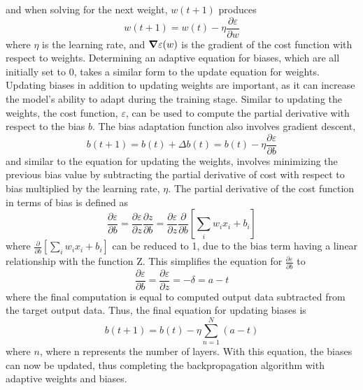 \documentclass[twocolumn]{article}
\begin{document}
and when solving for the next weight, $w(t+1)$ produces
\begin{equation}
    w(t+1) = w(t) - \eta \frac{\partial \varepsilon}{\partial w}
\end{equation}
where $\eta$ is the learning rate, and $\grad \varepsilon(w)$ is the gradient of the cost function with respect to weights. \cite{reid} Determining an adaptive equation for biases, which are all initially set to 0, takes a similar form to the update equation for weights. Updating biases in addition to updating weights are important, as it can increase the model's ability to adapt during the training stage. Similar to updating the weights, the cost function, $\varepsilon$, can be used to compute the partial derivative with respect to the bias $b$.\cite{zhang} The bias adaptation function also involves gradient descent, 
\begin{equation}
    b(t+1) = b(t) + \Delta b(t) = b(t) - \eta \frac{\partial \varepsilon}{\partial b}
\end{equation}
and similar to the equation for updating the weights, involves minimizing the previous bias value by subtracting the partial derivative of cost with respect to bias multiplied by the learning rate, $\eta$.\cite{zhang} The partial derivative of the cost function in terms of bias is defined as 
\begin{equation}
    \frac{\partial \varepsilon}{\partial b} = \frac{\partial \varepsilon}{\partial z} \frac{\partial z}{\partial b} = \frac{\partial \varepsilon}{\partial z} \frac{\partial}{\partial b} [\sum_{i} w_{i}x_{i}+b_{i}]
\end{equation}
where $\frac{\partial}{\partial b}[\sum_{i}w_{i}x_{i}+b_{i}]$ can be reduced to 1, due to the bias term having a linear relationship with the function Z. \cite{zhang} This simplifies the equation for $\frac{\partial \varepsilon}{\partial b}$ to 
\begin{equation}
    \frac{\partial \varepsilon}{\partial b} = \frac{\partial \varepsilon}{\partial z} = -\delta = a - t
\end{equation} 
where the final computation is equal to computed output data subtracted from the target output data.\cite{zhang} Thus, the final equation for updating biases is 
\begin{equation}
    b(t+1) = b(t) - \eta \sum_{n=1}^{N}(a - t)
\end{equation}
where $n$, where n represents the number of layers. \cite{zhang}With this equation, the biases can now be updated, thus completing the backpropagation algorithm with adaptive weights and biases. 
\end{document}
